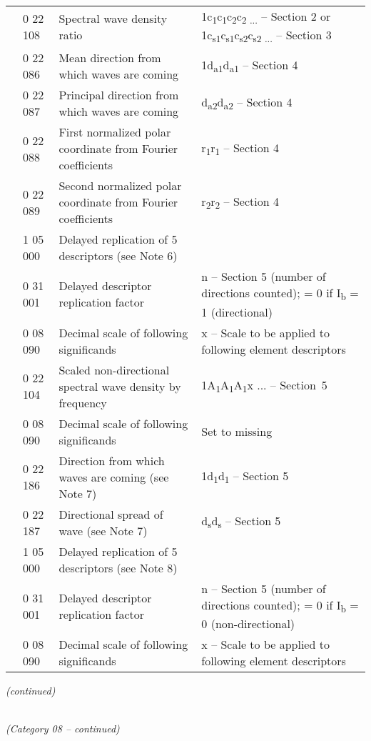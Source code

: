 \begin{longtable}[]{@{}llll@{}}
& 0 22 108 & Spectral wave density ratio & 1c\textsubscript{1}c\textsubscript{1}c\textsubscript{2}c\textsubscript{2 ...} -- Section 2 or 1c\textsubscript{s1}c\textsubscript{s1}c\textsubscript{s2}c\textsubscript{s2 ...} -- Section 3\tabularnewline
& 0 22 086 & Mean direction from which waves are coming & 1d\textsubscript{a1}d\textsubscript{a1} -- Section 4\tabularnewline
& 0 22 087 & Principal direction from which waves are coming & d\textsubscript{a2}d\textsubscript{a2} -- Section 4\tabularnewline
& 0 22 088 & First normalized polar coordinate from Fourier coefficients & r\textsubscript{1}r\textsubscript{1} -- Section 4\tabularnewline
& 0 22 089 & Second normalized polar coordinate from Fourier coefficients & r\textsubscript{2}r\textsubscript{2} -- Section 4\tabularnewline
& 1 05 000 & Delayed replication of 5 descriptors (see Note 6) &\tabularnewline
& 0 31 001 & Delayed descriptor replication factor & n -- Section 5 (number of directions counted); = 0 if I\textsubscript{b} = 1 (directional)\tabularnewline
& 0 08 090 & Decimal scale of following significands & x -- Scale to be applied to following element descriptors\tabularnewline
& 0 22 104 & Scaled non-directional spectral wave density by frequency & 1A\textsubscript{1}A\textsubscript{1}A\textsubscript{1}x ... -- Section~5\tabularnewline
& 0 08 090 & Decimal scale of following significands & Set to missing\tabularnewline
& 0 22 186 & Direction from which waves are coming (see Note 7) & 1d\textsubscript{1}d\textsubscript{1} -- Section 5\tabularnewline
& 0 22 187 & Directional spread of wave (see Note 7) & d\textsubscript{s}d\textsubscript{s} -- Section 5\tabularnewline
& 1 05 000 & Delayed replication of 5 descriptors (see Note 8) &\tabularnewline
& 0 31 001 & Delayed descriptor replication factor & n -- Section 5 (number of directions counted); = 0 if I\textsubscript{b} = 0 (non-directional)\tabularnewline
& 0 08 090 & Decimal scale of following significands & x -- Scale to be applied to following element descriptors\tabularnewline
\bottomrule
\end{longtable}

\emph{(continued)}

\emph{\\
(Category 08 -- continued)}

